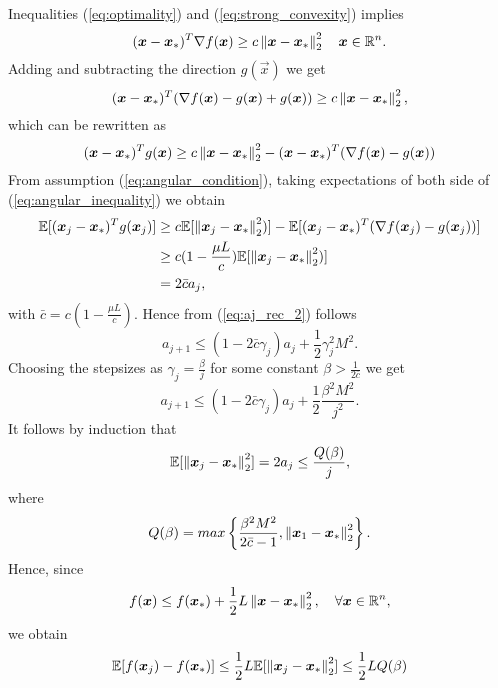 Inequalities (\ref{eq:optimality}) and (\ref{eq:strong_convexity}) implies
\begin{equation}
(\boldsymbol{x}-\boldsymbol{x}_*)^T \nabla f(\boldsymbol{x}) \geq c \left\Vert \boldsymbol{x}-\boldsymbol{x}_* \right\Vert^2_2 \quad \boldsymbol{x} \in \mathbb{R}^n.
\end{equation}
Adding and subtracting the direction $g(\vec{x})$ we get
\begin{equation}
(\boldsymbol{x}-\boldsymbol{x}_*)^T (\nabla f(\boldsymbol{x}) -g(\boldsymbol{x}) +g(\boldsymbol{x})) \geq c \left\Vert \boldsymbol{x}-\boldsymbol{x}_* \right\Vert^2_2,
\end{equation}
which can be rewritten as
\begin{equation}
(\boldsymbol{x}-\boldsymbol{x}_*)^T g(\boldsymbol{x}) \geq c \left\Vert \boldsymbol{x}-\boldsymbol{x}_* \right\Vert^2_2 - (\boldsymbol{x}-\boldsymbol{x}_*)^T (\nabla f(\boldsymbol{x}) -g(\boldsymbol{x}))
\label{eq:angular_inequality}
\end{equation}
From assumption (\ref{eq:angular_condition}), taking expectations of both side of (\ref{eq:angular_inequality}) we obtain
\begin{align}
\mathbb{E}[(\boldsymbol{x}_j-\boldsymbol{x}_*)^T g(\boldsymbol{x}_j)] &\geq c \mathbb{E}[\left\Vert \boldsymbol{x}_j-\boldsymbol{x}_* \right\Vert^2_2)] - \mathbb{E}[(\boldsymbol{x}_j-\boldsymbol{x}_*)^T (\nabla f(\boldsymbol{x}_j) -g(\boldsymbol{x}_j))]\\
&\geq c(1-\frac{\mu L}{c}) \mathbb{E}[\left\Vert \boldsymbol{x}_j-\boldsymbol{x}_* \right\Vert^2_2)]\\
& = 2\bar{c}a_j,
\end{align}
with $\bar{c}=c(1-\frac{\mu L}{c})$.
Hence from (\ref{eq:aj_rec_2}) follows 
\begin{equation}
a_{j+1} \leq (1-2\bar{c}\gamma_j)a_j + \frac{1}{2}\gamma_j^2M^2.
\end{equation}
Choosing the stepsizes as $\gamma_j = \frac{\beta}{j}$ for some constant $\beta>\frac{1}{2\bar{c}}$ we get
\begin{equation}
a_{j+1} \leq (1-2\bar{c}\gamma_j)a_j + \frac{1}{2}\frac{\beta^2M^2}{j^2}.
\end{equation}
It follows by induction that
\begin{equation}
\mathbb{E}[\left\Vert \boldsymbol{x}_j - \boldsymbol{x}_* \right\Vert^2_2] = 2a_j\leq \frac{Q(\beta)}{j},
\end{equation}
where 
\begin{equation}
Q(\beta) = max\left\{\frac{\beta^2M^2}{2\bar{c}-1},\left\Vert \boldsymbol{x}_1 - \boldsymbol{x}_* \right\Vert^2_2 \right\}.
\end{equation}
Hence, since
\begin{equation}
f(\boldsymbol{x})\leq f(\boldsymbol{x}_*) + \frac{1}{2}L\left\Vert \boldsymbol{x} - \boldsymbol{x}_* \right\Vert^2_2, \quad \forall \boldsymbol{x} \in \mathbb{R}^n,
\end{equation}
we obtain
\begin{equation}
\mathbb{E}[f(\boldsymbol{x}_j)-f(\boldsymbol{x}_*)] \leq \frac{1}{2} L \mathbb{E}[\left\Vert \boldsymbol{x}_j - \boldsymbol{x}_* \right\Vert^2_2] \leq \frac{1}{2}LQ(\beta)
\end{equation}

